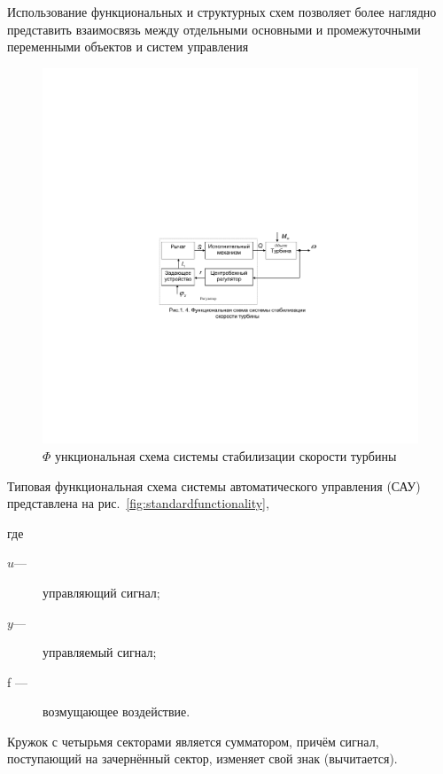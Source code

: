 Использование функциональных и структурных схем позволяет более наглядно представить взаимосвязь между отдельными основными и промежуточными переменными объектов и систем управления

\begin{figure}[h!]
	\centering
	\includegraphics[scale=0.95]{images/FunctionStabilization}
	\caption{$ \Phi $ ункциональная схема системы стабилизации скорости турбины}
	\label{fig:functionstabilization}
\end{figure}

Типовая функциональная схема системы автоматического управления (САУ) представлена на рис.~\ref{fig:standardfunctionality},

где \begin{description}
		\item[$ u $---] управляющий сигнал;
		\item[$ y $---] управляемый сигнал;
		\item[f ---] возмущающее воздействие.
\end{description}

Кружок с четырьмя секторами является сумматором, причём сигнал, поступающий на зачернённый сектор, изменяет свой знак (вычитается).

